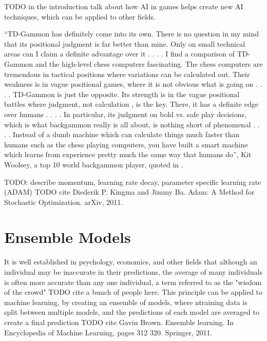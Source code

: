 TODO in the introduction talk about how AI in games helps create new AI techniques, which can be applied to other fields.

“TD-Gammon has definitely come into its own. There is no question in my mind that its positional judgment is far better than mine.
Only on small technical areas can I claim a definite advantage over
it . . . . I find a comparison of TD-Gammon and the high-level chess
computers fascinating. The chess computers are tremendous in
tactical positions where variations can be calculated out. Their
weakness is in vague positional games, where it is not obvious
what is going on . . . . TD-Gammon is just the opposite. Its strength
is in the vague positional battles where judgment, not calculation ,
is the key. There, it has a definite edge over humans . . . . In particular, its judgment on bold vs. safe play decisions, which is what
backgammon really is all about, is nothing short of phenomenal . . . .
Instead of a dumb machine which can calculate things much faster
than humans such as the chess playing computers, you have built
a smart machine which learns from experience pretty much the
same way that humans do”, Kit Woolsey, a top 10 world backgammon player, quoted in \cite{Tesauro1995}.

TODO: describe momentum, learning rate decay, parameter specific learning rate (ADAM) TODO cite Diederik P. Kingma and Jimmy Ba. Adam: A Method for Stochastic Optimization. arXiv, 2011.

\section{Ensemble Models}
It is well established in psychology, economics, and other fields that although an individual may be inaccurate in their predictions, the average of many individuals is often more accurate than any one individual, a term referred to as the "wisdom of the crowd" TODO cite a bunch of people here.
This principle can be applied to machine learning, by creating an ensemble of models, where ntraining data is split between multiple models, and the predictions of each model are averaged to create a final prediction TODO cite Gavin Brown. Ensemble learning. In Encyclopedia of Machine Learning, pages 312 320. Springer, 2011. 
